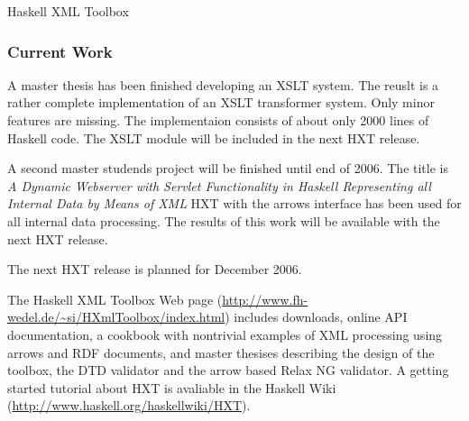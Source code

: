 \begin{hcarentry}[updated]{Haskell XML Toolbox}
\subsubsection*{Current Work}

A master thesis has been finished developing an XSLT
system. The reuslt is a rather complete implementation of
an XSLT transformer system. Only minor features are missing.
The implementaion consists of about only 2000 lines of Haskell code.
The XSLT module will be included in the next HXT release.

A second master studends project will be finished until end of 2006.
The title is {\em A Dynamic Webserver with Servlet Functionality in
  Haskell Representing all Internal Data by Means of XML}
HXT with the arrows interface has been used for all internal data processing.
The results of this work will be available with the next HXT release.

The next HXT release is planned for December 2006.

\FurtherReading

The Haskell XML Toolbox Web page
(\url{http://www.fh-wedel.de/~si/HXmlToolbox/index.html})
includes downloads, online API documentation, a cookbook with nontrivial examples
of XML processing using arrows and RDF documents, and master thesises describing the
design of the toolbox, the DTD validator and the arrow based Relax NG
validator.
A getting started tutorial about HXT is avaliable in the Haskell Wiki (\url{http://www.haskell.org/haskellwiki/HXT}).
\end{hcarentry}
